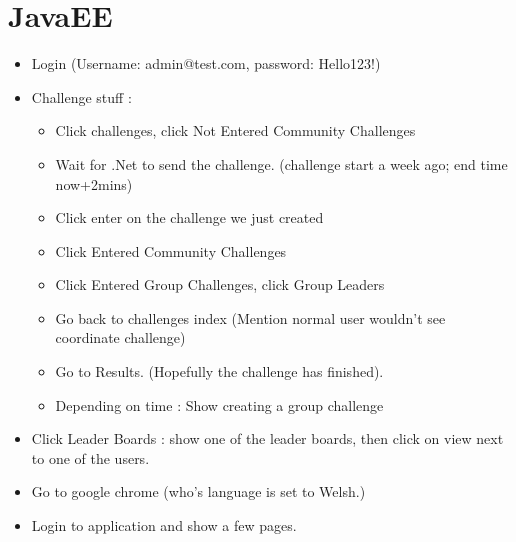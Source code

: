 \documentclass[10pt,a4paper]{report}
\begin{document}
\section*{JavaEE}
\begin{itemize}
\item Login (Username: admin@test.com, password: Hello123!)
\item Challenge stuff :
\begin{itemize}
\item Click challenges, click Not Entered Community Challenges
\item Wait for .Net to send the challenge. (challenge start a week ago; end time now+2mins)
\item Click enter on the challenge we just created
\item Click Entered Community Challenges
\item Click Entered Group Challenges, click Group Leaders
\item Go back to challenges index (Mention normal user wouldn't see coordinate challenge)
\item Go to Results. (Hopefully the challenge has finished).
\item Depending on time : Show creating a group challenge
\end{itemize}
\item Click Leader Boards : show one of the leader boards, then click on view next to one of the users.
\item Go to google chrome (who's language is set to Welsh.)
\item Login to application and show a few pages.
\end{itemize}
\end{document}
